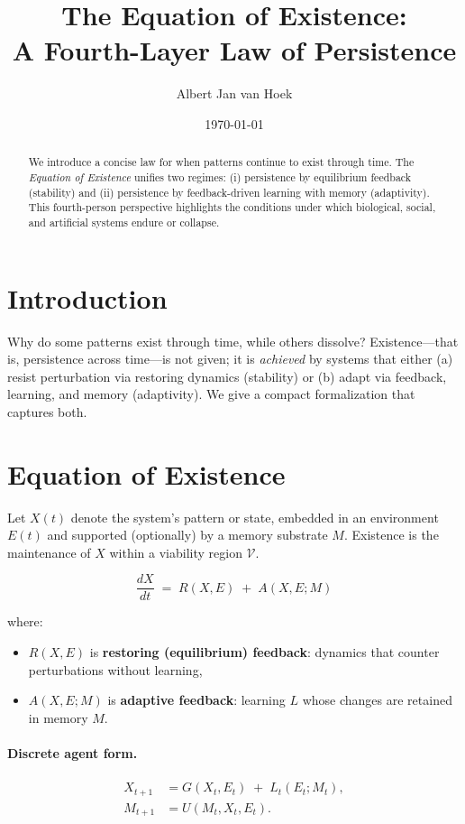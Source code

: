 \documentclass[a4paper,11pt]{article}
\title{The Equation of Existence:\\A Fourth-Layer Law of Persistence}
\author{Albert Jan van Hoek}
\date{\today}
\begin{document}
\maketitle

\begin{abstract}
We introduce a concise law for when patterns continue to exist through time. The \emph{Equation of Existence} unifies two regimes: (i) persistence by equilibrium feedback (stability) and (ii) persistence by feedback-driven learning with memory (adaptivity). This fourth-person perspective highlights the conditions under which biological, social, and artificial systems endure or collapse.
\end{abstract}

\section{Introduction}
Why do some patterns exist through time, while others dissolve?
Existence---that is, persistence across time---is not given; it is \emph{achieved} by systems that either (a) resist perturbation via restoring dynamics (stability) or (b) adapt via feedback, learning, and memory (adaptivity).
We give a compact formalization that captures both.

\section{Equation of Existence}
Let $X(t)$ denote the system's pattern or state, embedded in an environment $E(t)$ and supported (optionally) by a memory substrate $M$.
Existence is the maintenance of $X$ within a viability region $\mathcal{V}$.

\begin{equation}
\boxed{\frac{dX}{dt} \;=\; R\!\left(X,E\right) \;+\; A\!\left(X,E;M\right)}
\label{eq:existence}
\end{equation}

\noindent where:
\begin{itemize}
  \item $R(X,E)$ is \textbf{restoring (equilibrium) feedback}: dynamics that counter perturbations without learning,
  \item $A(X,E;M)$ is \textbf{adaptive feedback}: learning $L$ whose changes are retained in memory $M$.
\end{itemize}

\paragraph{Discrete agent form.}
\begin{align}
X_{t+1} &= G\!\left(X_t,E_t\right) \;+\; L_t\!\left(E_t;M_t\right), \\
M_{t+1} &= U\!\left(M_t,X_t,E_t\right).
\end{align}
\end{document}
